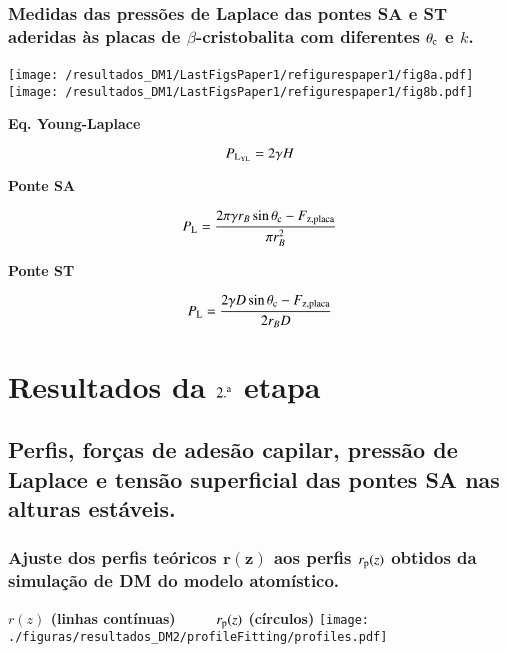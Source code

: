 \documentclass[8pt]{beamer}
\begin{document}
\begin{frame}
	\frametitle{\textbf{Medidas das pressões de Laplace} das pontes SA e ST aderidas às placas de $\beta$-cristobalita com diferentes $\theta_{\rm c}$ e $k$.}
	\begin{center}
		\texttt{[image: /resultados\_DM1/LastFigsPaper1/refigurespaper1/fig8a.pdf]}~~
		\texttt{[image: /resultados\_DM1/LastFigsPaper1/refigurespaper1/fig8b.pdf]}\\
	\end{center}
	\vspace{0.5cm}
 	\begin{minipage}{0.3\textwidth}
 		\begin{center}
 		  \textbf{Eq. Young-Laplace}
 		\end{center}	
			$$ P_{\rm L_{YL}} = 2 \gamma H$$
	\end{minipage}
	\begin{minipage}{0.35\textwidth}
		\begin{center}
		  \textbf{Ponte SA}
		\end{center}
          $$P_{\rm L} = \frac{2\pi\gamma r_B\sin\theta_{\rm c} - F_{\rm z,placa}}{\pi r_B^2} $$
	\end{minipage}
	\begin{minipage}{0.325\textwidth}
		\begin{center}
		  \textbf{Ponte ST}
		\end{center}
	      $$P_{\rm L} = \frac{2\gamma D\sin\theta_{\rm c} - F_{\rm z,placa}}{2 r_B D} $$		
	\end{minipage}
\end{frame}

\section{Resultados da $2.^{\rm a}$ etapa}

\subsection{Perfis, forças de adesão capilar, pressão de Laplace e tensão superficial das pontes SA nas alturas estáveis.}



\begin{frame}
\frametitle{\textbf{Ajuste dos perfis teóricos $\mathbf{r(z)}$} aos perfis $r_{\rm p}(z)$ obtidos da simulação de DM do modelo atomístico.}
	\begin{center}
		\textbf{\small $r(z)$ (linhas contínuas)~~~~~$r_{\rm p}(z)$ (círculos)}
        \texttt{[image: ./figuras/resultados\_DM2/profileFitting/profiles.pdf]}   
	\end{center}
\end{frame}
\end{document}

